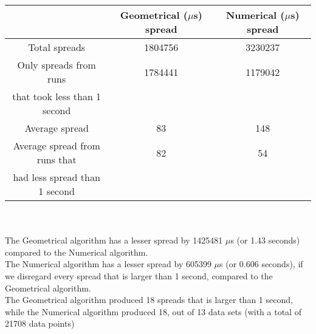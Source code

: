\begin{tabular}[3]{c|c|c}
 & Geometrical ($\mu$s) spread & Numerical ($\mu$s) spread\\
\hline
Total spreads & 1804756 & 3230237 \\ 
\hline 
Only spreads from runs & 1784441 & 1179042 \\ 
that took less than 1 second & & \\ 
\hline
Average spread & 83 & 148 \\
\hline
Average spread from runs that & 82 & 54 \\ 
had less spread than 1 second & & \\ 
\end{tabular}\\ \\
The Geometrical algorithm has a lesser spread by 1425481 $\mu$s (or 1.43 seconds) compared to the Numerical algorithm.\\
The Numerical algorithm has a lesser spread by 605399 $\mu$s (or 0.606 seconds), if we disregard every spread that is larger than 1 second, compared to the Geometrical algorithm.\\
The Geometrical algorithm produced 18 spreads that is larger than 1 second, while the Numerical algorithm produced 18, out of 13 data sets (with a total of 21708 data points)\\
